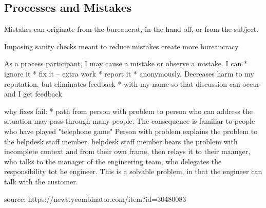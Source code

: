 \subsection{Processes and Mistakes}

Mistakes can originate from the bureaucrat, in the hand off, or from the subject.

Imposing sanity checks meant to reduce mistakes create more bureaucracy 


As a process participant, I may cause a mistake or observe a mistake. I can 
* ignore it
* fix it -- extra work
* report it
    * anonymously. Decreases harm to my reputation, but eliminates feedback
    * with my name so that discussion can occur and I get feedback
    
    
    

why fixes fail:
* path from person with problem to person who can address the situation may pass through many people. 
The consequence is familiar to people who have played "telephone game"
Person with problem explains the problem to the helpdesk staff member. helpdesk staff member hears the problem with incomplete context and from their own frame, then relays it to their maanger, who talks to the manager of the engineering team, who delegates the responsibility tot he engineer. 
This is a solvable problem, in that the engineer can talk with the customer. 

source: 
https://news.ycombinator.com/item?id=30480083